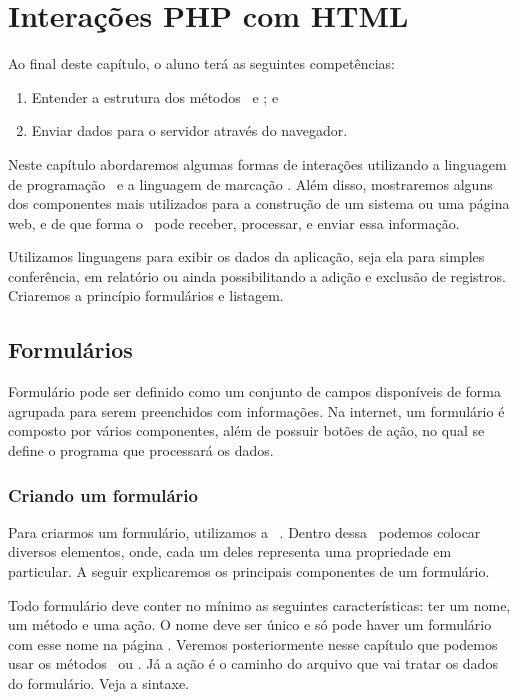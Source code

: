 \chapter{Interações PHP com HTML}
\label{interacoes-php-com-html}

Ao final deste capítulo, o aluno terá as seguintes competências:
\begin{enumerate}
    \item Entender a estrutura dos métodos \metodoGET~e \metodoPOST; e
    \item Enviar dados para o servidor através do navegador.
\end{enumerate}

Neste capítulo abordaremos algumas formas de interações utilizando a linguagem de 
programação \php~e a linguagem de marcação \html. Além disso, mostraremos alguns dos
componentes mais utilizados para a construção de um sistema ou uma página web, e de 
que forma o \php~pode receber, processar, e enviar essa informação.

Utilizamos linguagens para exibir os dados da aplicação, seja ela para simples 
conferência, em relatório ou ainda possibilitando a adição e exclusão de registros. 
Criaremos a princípio formulários e listagem.

\section{Formulários}
\label{formularios}

Formulário pode ser definido como um conjunto de campos disponíveis de forma agrupada 
para serem preenchidos com informações. Na internet, um formulário é composto por vários 
componentes, além de possuir botões de ação, no qual se define o programa que processará 
os dados.

\subsection{Criando um formulário}
\label{criando-um-formulario}

Para criarmos um formulário, utilizamos a \tag~\tagform. Dentro dessa \tag~podemos colocar 
diversos elementos, onde, cada um deles representa uma propriedade em particular. 
A seguir explicaremos os principais componentes de um formulário.

Todo formulário deve conter no mínimo as seguintes características: ter um nome, um método
e uma ação. O nome deve ser único e só pode haver um formulário com esse nome na página
\php. Veremos posteriormente nesse capítulo que podemos usar os métodos \metodoGET~ou
\metodoPOST. Já a ação é o caminho do arquivo que vai tratar os dados do formulário.
Veja a sintaxe.

